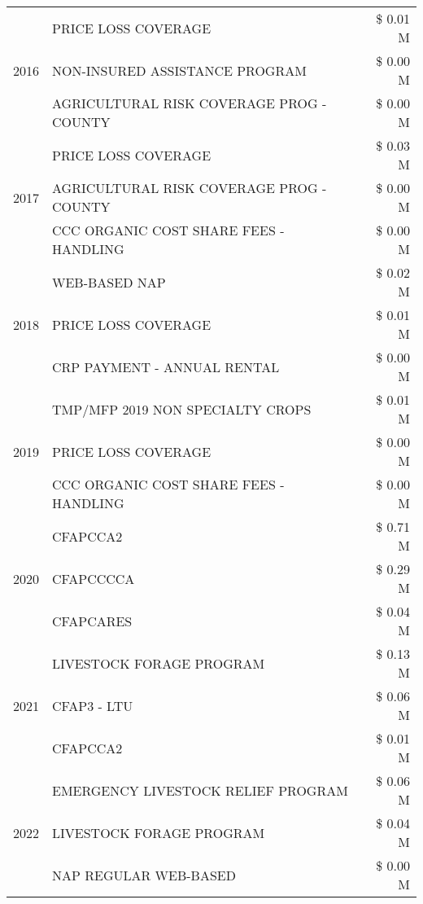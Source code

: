 \begin{tabular}{llr}
\cline{1-3}
\multirow[t]{3}{*}{2016} & PRICE LOSS COVERAGE & \$ 0.01 M \\
 & NON-INSURED ASSISTANCE PROGRAM & \$ 0.00 M \\
 & AGRICULTURAL RISK COVERAGE PROG - COUNTY & \$ 0.00 M \\
\cline{1-3}
\multirow[t]{3}{*}{2017} & PRICE LOSS COVERAGE & \$ 0.03 M \\
 & AGRICULTURAL RISK COVERAGE PROG - COUNTY & \$ 0.00 M \\
 & CCC ORGANIC COST SHARE FEES - HANDLING & \$ 0.00 M \\
\cline{1-3}
\multirow[t]{3}{*}{2018} & WEB-BASED NAP & \$ 0.02 M \\
 & PRICE LOSS COVERAGE & \$ 0.01 M \\
 & CRP PAYMENT - ANNUAL RENTAL & \$ 0.00 M \\
\cline{1-3}
\multirow[t]{3}{*}{2019} & TMP/MFP 2019 NON SPECIALTY CROPS & \$ 0.01 M \\
 & PRICE LOSS COVERAGE & \$ 0.00 M \\
 & CCC ORGANIC COST SHARE FEES - HANDLING & \$ 0.00 M \\
\cline{1-3}
\multirow[t]{3}{*}{2020} & CFAPCCA2 & \$ 0.71 M \\
 & CFAPCCCCA & \$ 0.29 M \\
 & CFAPCARES & \$ 0.04 M \\
\cline{1-3}
\multirow[t]{3}{*}{2021} & LIVESTOCK FORAGE PROGRAM & \$ 0.13 M \\
 & CFAP3 - LTU & \$ 0.06 M \\
 & CFAPCCA2 & \$ 0.01 M \\
\cline{1-3}
\multirow[t]{3}{*}{2022} & EMERGENCY LIVESTOCK RELIEF PROGRAM & \$ 0.06 M \\
 & LIVESTOCK FORAGE PROGRAM & \$ 0.04 M \\
 & NAP REGULAR WEB-BASED & \$ 0.00 M \\
\cline{1-3}
\bottomrule
\end{tabular}
